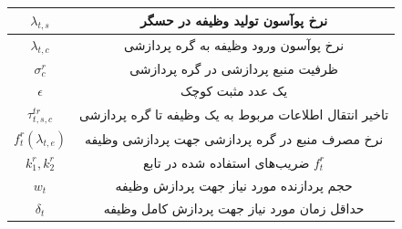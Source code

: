 \begin{table}[h!]
\begin{tabularx}{\textwidth}{|c|C|}
			$\lambda_{t,s}$ 	& نرخ پوآسون تولید وظیفه در حسگر \\ \hline
			$\lambda_{t,c}$ 	& نرخ پوآسون ورود وظیفه به گره پردازشی \\ \hline
			$\sigma_c^r$ 		& ظرفیت منبع پردازشی در گره پردازشی \\ \hline
			$\epsilon$ 			& یک عدد مثبت کوچک \\ \hline
			$\tau_{t,s,c}^{tr}$ & تاخیر انتقال اطلاعات مربوط به یک وظیفه تا گره پردازشی \\ \hline
			$f_t^r(\lambda_{t,e})$ 	& نرخ مصرف منبع در گره پردازشی جهت پردازشی وظیفه \\ \hline
			$k_1^r, k_2^r$ 			& ضریب‌های استفاده شده در تابع $f_t^r$ \\ \hline
			$w_t$ 				& حجم پردازنده مورد نیاز جهت پردازش وظیفه  \\ \hline
			$\delta_t$ 			& حداقل زمان مورد نیاز جهت پردازش کامل وظیفه \\ \hline
		\end{tabularx}
		\label{tbl:system_model:notation}
	\end{table}

